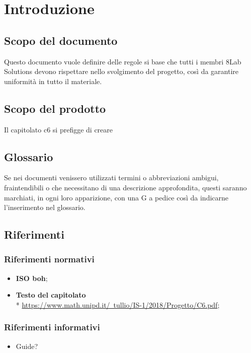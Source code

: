 \section{Introduzione}
\subsection{Scopo del documento}
Questo documento vuole definire delle regole si base che tutti i membri 8Lab
Solutions devono rispettare nello svolgimento del progetto, così da garantire
uniformità in tutto il materiale.
\subsection{Scopo del prodotto}
Il capitolato c6 si prefigge di creare 
\subsection{Glossario}
Se nei documenti venissero utilizzati termini o abbreviazioni ambigui,
fraintendibili o che necessitano di una descrizione approfondita, questi saranno marchiati, in ogni loro apparizione, con una G a pedice così da indicarne l'inserimento nel glossario.
\subsection{Riferimenti}
\subsubsection{Riferimenti normativi}
\begin{itemize}
\item \textbf{ISO boh}; %
\item \textbf{Testo del capitolato} \\*  \href{https://www.math.unipd.it/~tullio/IS-1/2018/Progetto/C6.pdf}{https://www.math.unipd.it/~tullio/IS-1/2018/Progetto/C6.pdf};
\end{itemize}
\subsubsection{Riferimenti informativi}
\begin{itemize}
\item Guide?
\end{itemize}